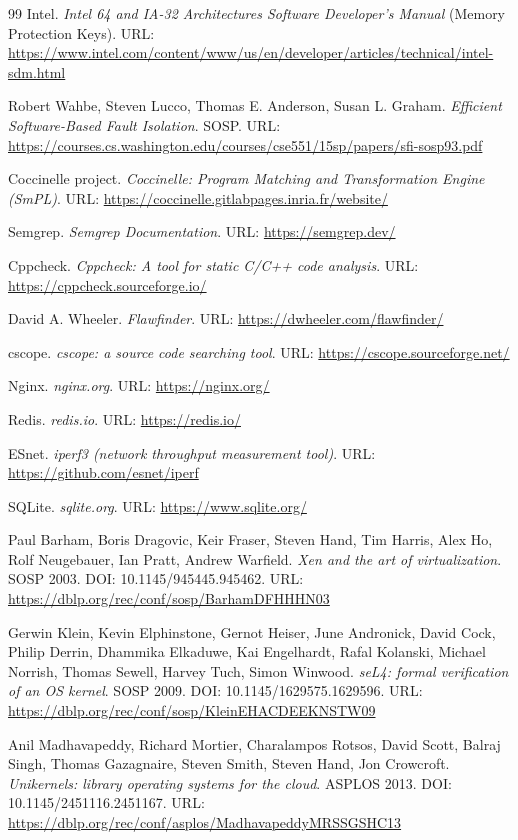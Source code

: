\documentclass[UTF8,a4paper,12pt]{ctexart}
\numberwithin{equation}{section}
\begin{document}
\begin{thebibliography}{99}
 Intel. \emph{Intel 64 and IA-32 Architectures Software
Developer's Manual} (Memory Protection Keys). URL:
\url{https://www.intel.com/content/www/us/en/developer/articles/technical/intel-sdm.html}

 Robert Wahbe, Steven Lucco, Thomas E. Anderson, Susan L. Graham.
\emph{Efficient Software-Based Fault Isolation}. SOSP.
URL:
\url{https://courses.cs.washington.edu/courses/cse551/15sp/papers/sfi-sosp93.pdf}

 Coccinelle project. \emph{Coccinelle: Program Matching and
Transformation Engine (SmPL)}. URL:
\url{https://coccinelle.gitlabpages.inria.fr/website/}

 Semgrep. \emph{Semgrep Documentation}. URL:
\url{https://semgrep.dev/}

 Cppcheck. \emph{Cppcheck: A tool for static C/C++ code
analysis}. URL: \url{https://cppcheck.sourceforge.io/}

 David A. Wheeler. \emph{Flawfinder}. URL:
\url{https://dwheeler.com/flawfinder/}

 cscope. \emph{cscope: a source code searching tool}. URL:
\url{https://cscope.sourceforge.net/}

 Nginx. \emph{nginx.org}. URL: \url{https://nginx.org/}

 Redis. \emph{redis.io}. URL: \url{https://redis.io/}

 ESnet. \emph{iperf3 (network throughput measurement tool)}.
URL: \url{https://github.com/esnet/iperf}

 SQLite. \emph{sqlite.org}. URL: \url{https://www.sqlite.org/}

 Paul Barham, Boris Dragovic, Keir Fraser, Steven Hand, Tim
Harris, Alex Ho, Rolf Neugebauer, Ian Pratt, Andrew Warfield. \emph{Xen
and the art of virtualization}. SOSP 2003. DOI: 10.1145/945445.945462.
URL: \url{https://dblp.org/rec/conf/sosp/BarhamDFHHHN03}

 Gerwin Klein, Kevin Elphinstone, Gernot Heiser, June Andronick,
David Cock, Philip Derrin, Dhammika Elkaduwe, Kai Engelhardt, Rafal
Kolanski, Michael Norrish, Thomas Sewell, Harvey Tuch, Simon Winwood.
\emph{seL4: formal verification of an OS kernel}. SOSP 2009. DOI:
10.1145/1629575.1629596. URL:
\url{https://dblp.org/rec/conf/sosp/KleinEHACDEEKNSTW09}

 Anil Madhavapeddy, Richard Mortier, Charalampos Rotsos, David
Scott, Balraj Singh, Thomas Gazagnaire, Steven Smith, Steven Hand, Jon
Crowcroft. \emph{Unikernels: library operating systems for the cloud}.
ASPLOS 2013. DOI: 10.1145/2451116.2451167. URL:
\url{https://dblp.org/rec/conf/asplos/MadhavapeddyMRSSGSHC13}


\end{thebibliography}
\end{document}
